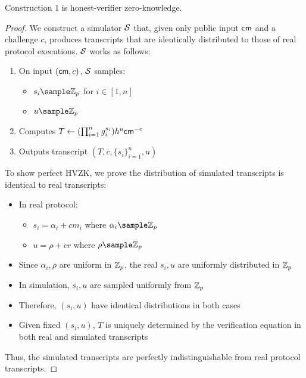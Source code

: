 \begin{theorem}
    Construction 1 is honest-verifier zero-knowledge.
\end{theorem}
\begin{proof}
    We construct a simulator $\mathcal{S}$ that, given only public input $\mathsf{cm}$ and a challenge $c$, produces transcripts that are identically distributed to those of real protocol executions. $\mathcal{S}$ works as follows:
    \begin{enumerate}
        \item On input $(\mathsf{cm}, c)$, $\mathcal{S}$ samples:
            \begin{itemize}
                \item $s_i \sample \Z_p$ for $i \in [1,n]$
                \item $u \sample \Z_p$
            \end{itemize}
            
        \item Computes $T \gets (\prod_{i=1}^n g_i^{s_i})h^u\mathsf{cm}^{-c}$
        
        \item Outputs transcript $(T, c, \{s_i\}_{i=1}^n, u)$
    \end{enumerate}

    To show perfect HVZK, we prove the distribution of simulated transcripts is identical to real transcripts:
    \begin{itemize}
        \item In real protocol: 
            \begin{itemize}
                \item $s_i = \alpha_i + cm_i$ where $\alpha_i \sample \Z_p$
                \item $u = \rho + cr$ where $\rho \sample \Z_p$
            \end{itemize}
        \item Since $\alpha_i, \rho$ are uniform in $\mathbb{Z}_p$, the real $s_i, u$ are uniformly distributed in $\mathbb{Z}_p$
        \item In simulation, $s_i, u$ are sampled uniformly from $\mathbb{Z}_p$
        \item Therefore, $(s_i, u)$ have identical distributions in both cases
        \item Given fixed $(s_i, u)$, $T$ is uniquely determined by the verification equation in both real and simulated transcripts
    \end{itemize}
    Thus, the simulated transcripts are perfectly indistinguishable from real protocol transcripts.
\end{proof}


